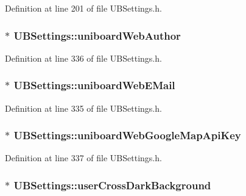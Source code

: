 Definition at line 201 of file U\-B\-Settings.\-h.

\hypertarget{class_u_b_settings_a2bc708f57654f04563cf29d82d9d9d6a}{
\subsubsection[{uniboard\-Web\-Author}]{$\ast$ U\-B\-Settings\-::uniboard\-Web\-Author}}\label{db/d66/class_u_b_settings_a2bc708f57654f04563cf29d82d9d9d6a}


Definition at line 336 of file U\-B\-Settings.\-h.

\hypertarget{class_u_b_settings_a6c126b94fae10229b3df238222828ae8}{
\subsubsection[{uniboard\-Web\-E\-Mail}]{$\ast$ U\-B\-Settings\-::uniboard\-Web\-E\-Mail}}\label{db/d66/class_u_b_settings_a6c126b94fae10229b3df238222828ae8}


Definition at line 335 of file U\-B\-Settings.\-h.

\hypertarget{class_u_b_settings_aa52b8e29071c46d7c615b0528003bc4c}{
\subsubsection[{uniboard\-Web\-Google\-Map\-Api\-Key}]{$\ast$ U\-B\-Settings\-::uniboard\-Web\-Google\-Map\-Api\-Key}}\label{db/d66/class_u_b_settings_aa52b8e29071c46d7c615b0528003bc4c}


Definition at line 337 of file U\-B\-Settings.\-h.

\hypertarget{class_u_b_settings_a05a319676b2f30edc2aef2f80d2b2d37}{
\subsubsection[{user\-Cross\-Dark\-Background}]{$\ast$ U\-B\-Settings\-::user\-Cross\-Dark\-Background}}\label{db/d66/class_u_b_settings_a05a319676b2f30edc2aef2f80d2b2d37}


